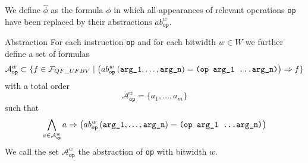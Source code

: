 We define $\hat{\phi}$ as the formula $\phi$ in which all appearances of relevant operations \texttt{op} have been replaced by their abstractions $ab_\texttt{op}^w$.\\

\begin{definition}{Abstraction}
For each instruction \texttt{op} and for each bitwidth $w\in W$  we further define a set of formulas
\[\mathcal{A}_\texttt{op}^w \subset \{f \in \mathcal{F}_{QF\_UFBV} \mid \left( ab_{\texttt{op}}^w\left(\texttt{arg\_1}, \dots, \texttt{arg\_n}\right)=\texttt{(op arg\_1 \dots arg\_n)} \right) \Rightarrow f\}\]
with a total order
\[\mathcal{A}_\texttt{op}^w  = \{a_1, \dots, a_m\}\]
such that
\[\bigwedge\limits_{a\in\mathcal{A}_\texttt{op}^w} a \Rightarrow \left(ab_{\texttt{op}}^w\left(\texttt{arg\_1}, \dots, \texttt{arg\_n}\right)=\texttt{(op arg\_1 \dots arg\_n)}\right)\]
We call the set $\mathcal{A}_\texttt{op}^w$ the abstraction of \texttt{op} with bitwidth $w$.
\end{definition}

